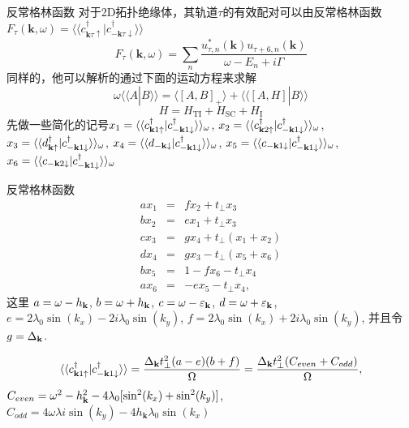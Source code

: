 \documentclass[10pt,aspectratio=169]{beamer} %
\begin{document}
\begin{frame}{反常格林函数}
对于2D拓扑绝缘体，其轨道$\tau$的有效配对可以由反常格林函数$F_\tau(\mathbf{k},\omega)=\langle\langle c^\dagger_{\mathbf{k}\tau\uparrow}|c^\dagger_{\mathbf{-k}\tau\downarrow}\rangle\rangle$
\begin{equation}
F_\tau(\mathbf{k},\omega)=\sum_n\frac{u^{*}_{\tau,n}(\mathbf{k})u_{\tau+6,n}(\mathbf{k})}{\omega-E_n+i\Gamma}\label{af1}
\end{equation}
同样的，他可以解析的通过下面的运动方程来求解
\begin{equation}
\omega\langle\langle A|B\rangle\rangle=\langle\left[A,B\right]_{+}\rangle+\langle\langle\left[A,H\right]|B\rangle\rangle\label{gf11}
\end{equation}
\begin{equation}
H=H_\mathrm{TI}+H_\mathrm{SC}+H_\mathrm{I}\label{ham}
\end{equation}
先做一些简化的记号$x_1=\langle\langle c_{{\bf k}1\uparrow}^\dagger|c_{-{\bf k}1\downarrow}^\dagger\rangle\rangle_\omega$,
$x_2 = \langle\langle c_{{\bf k}2\uparrow}^\dagger|c_{-{\bf k}1\downarrow}^\dagger\rangle\rangle_\omega$,
$x_3 = \langle\langle d_{{\bf k}\uparrow}^\dagger|c_{-{\bf k}1\downarrow}^\dagger\rangle\rangle_\omega$,
$x_4 = \langle\langle d_{-{\bf k}\downarrow}|c_{-{\bf k}1\downarrow}^\dagger\rangle\rangle_\omega$,
$x_5 = \langle\langle c_{-{\bf k}1\downarrow}|c_{-{\bf k}1\downarrow}^\dagger\rangle\rangle_\omega$,
$x_6 = \langle\langle c_{-{\bf k}2\downarrow}|c_{-{\bf k}1\downarrow}^\dagger\rangle\rangle_\omega$
\end{frame}
\begin{frame}{反常格林函数}
\begin{subequations}
	\begin{eqnarray}
	ax_1&=&fx_2+t_\perp x_3
	\\
	bx_2&=&ex_1+t_\perp x_3
	\\
	cx_3&=&gx_4+t_\perp (x_1+x_2)
	\\
	dx_4&=&gx_3-t_\perp (x_5+x_6)
	\\
	bx_5&=&1-fx_6-t_\perp x_4
	\\
	ax_6&=&-ex_5-t_\perp x_4,\label{eom2}
	\end{eqnarray}
\end{subequations}
这里 $a=\omega-h_{\bf k}$, $b=\omega + h_{\bf k}$, $c=\omega-\varepsilon_{\bf k}$,
$d=\omega+\varepsilon_{\bf k}$, $e=2\lambda_0\sin(k_x)-2i \lambda_0\sin(k_y)$, $f=2\lambda_0\sin(k_x) + 2i\lambda_0\sin(k_y)$,
并且令 $g = \Delta_{\bf k}$.

\begin{equation}
\langle\langle c_{{\bf k}1\uparrow}^\dagger|c_{-{\bf k}1\downarrow}^\dagger\rangle\rangle=\frac{\Delta_{\bf k} t_\perp ^2 (a-e) (b+f)}{\Omega}=\frac{\Delta_{\bf k}t_\perp^2(C_{even}+C_{odd})}{\Omega},\label{anlyagf}
\end{equation} $C_{even}=\omega^2-h^2_{\bf{k}}-4\lambda_0[\sin^2(k_x)+\sin^2(k_y)]$, $C_{odd}=4\omega\lambda i\sin(k_y)-4h_{\mathbf{k}}\lambda_0\sin(k_x)$
\end{frame}
\end{document}
